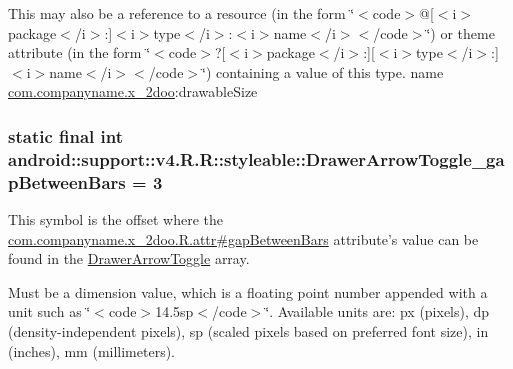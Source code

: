 This may also be a reference to a resource (in the form \char`\"{}$<$code$>$@\mbox{[}$<$i$>$package$<$/i$>$:\mbox{]}$<$i$>$type$<$/i$>$:$<$i$>$name$<$/i$>$$<$/code$>$\char`\"{}) or theme attribute (in the form \char`\"{}$<$code$>$?\mbox{[}$<$i$>$package$<$/i$>$:\mbox{]}\mbox{[}$<$i$>$type$<$/i$>$:\mbox{]}$<$i$>$name$<$/i$>$$<$/code$>$\char`\"{}) containing a value of this type.  name \hyperlink{namespacecom_1_1companyname_1_1x__2doo}{com.companyname.x\_\-2doo}:drawableSize \hypertarget{classandroid_1_1support_1_1v4_1_1_r_1_1styleable_d16bea2da35eaa358153b1dbdb3bf075}{
\subsubsection[{DrawerArrowToggle\_\-gapBetweenBars}]{\setlength{\rightskip}{0pt plus 5cm}static final int android::support::v4.R.R::styleable::DrawerArrowToggle\_\-gapBetweenBars = 3}}
\label{classandroid_1_1support_1_1v4_1_1_r_1_1styleable_d16bea2da35eaa358153b1dbdb3bf075}


This symbol is the offset where the \hyperlink{classcom_1_1companyname_1_1x__2doo_1_1_r_1_1attr_211bb3d591a9d6756bae3983e3ef689d}{com.companyname.x\_\-2doo.R.attr\#gapBetweenBars} attribute's value can be found in the \hyperlink{classandroid_1_1support_1_1v4_1_1_r_1_1styleable_df2952a999161d3c408fb6267800afe6}{DrawerArrowToggle} array.

Must be a dimension value, which is a floating point number appended with a unit such as \char`\"{}$<$code$>$14.5sp$<$/code$>$\char`\"{}. Available units are: px (pixels), dp (density-independent pixels), sp (scaled pixels based on preferred font size), in (inches), mm (millimeters). 

